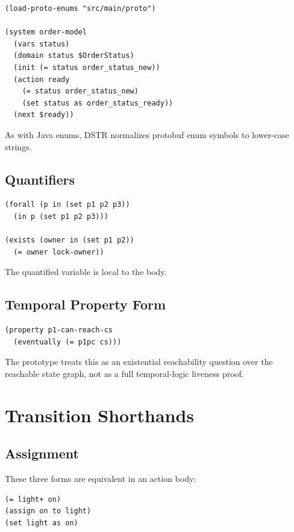 \documentclass[11pt]{article}
\begin{document}
\begin{lstlisting}[language=DSTR]
(load-proto-enums "src/main/proto")

(system order-model
  (vars status)
  (domain status $OrderStatus)
  (init (= status order_status_new))
  (action ready
    (= status order_status_new)
    (set status as order_status_ready))
  (next $ready))
\end{lstlisting}

As with Java enums, DSTR normalizes protobuf enum symbols to lower-case strings.

\subsection{Quantifiers}

\begin{lstlisting}[language=DSTR]
(forall (p in (set p1 p2 p3))
  (in p (set p1 p2 p3)))

(exists (owner in (set p1 p2))
  (= owner lock-owner))
\end{lstlisting}

The quantified variable is local to the body.

\subsection{Temporal Property Form}

\begin{lstlisting}[language=DSTR]
(property p1-can-reach-cs
  (eventually (= p1pc cs)))
\end{lstlisting}

The prototype treats this as an existential reachability question over the
reachable state graph, not as a full temporal-logic liveness proof.

\section{Transition Shorthands}

\subsection{Assignment}

These three forms are equivalent in an action body:

\begin{lstlisting}[language=DSTR]
(= light+ on)
(assign on to light)
(set light as on)
\end{lstlisting}
\end{document}
